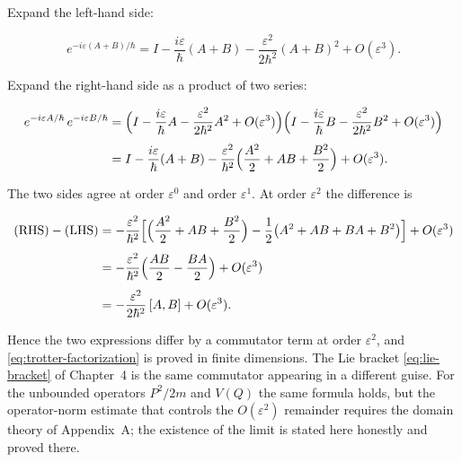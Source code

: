 \medskip\noindent Expand the left-hand side:
\begin{linenomath}
\begin{equation*}
e^{-i\varepsilon(A+B)/\hbar}
= I - \frac{i\varepsilon}{\hbar}(A+B) - \frac{\varepsilon^2}{2\hbar^2}(A+B)^2 + O(\varepsilon^3) .
\end{equation*}
\end{linenomath}
Expand the right-hand side as a product of two series:
\begin{linenomath}
\begin{equation*}
\begin{aligned}
e^{-i\varepsilon A/\hbar}\,e^{-i\varepsilon B/\hbar}
&= \Bigl(I - \frac{i\varepsilon}{\hbar}A - \frac{\varepsilon^2}{2\hbar^2}A^2 + O(\varepsilon^3)\Bigr)
   \Bigl(I - \frac{i\varepsilon}{\hbar}B - \frac{\varepsilon^2}{2\hbar^2}B^2 + O(\varepsilon^3)\Bigr) \\[4pt]
&= I - \frac{i\varepsilon}{\hbar}(A+B)
   - \frac{\varepsilon^2}{\hbar^2}\Bigl(\frac{A^2}{2} + AB + \frac{B^2}{2}\Bigr) + O(\varepsilon^3) .
\end{aligned}
\end{equation*}
\end{linenomath}
The two sides agree at order $\varepsilon^0$ and order $\varepsilon^1$. At order $\varepsilon^2$ the difference is
\begin{linenomath}
\begin{equation*}
\begin{aligned}
\text{(RHS)} - \text{(LHS)}
&= -\frac{\varepsilon^2}{\hbar^2}\Bigl[\Bigl(\frac{A^2}{2} + AB + \frac{B^2}{2}\Bigr)
   - \frac{1}{2}\bigl(A^2 + AB + BA + B^2\bigr)\Bigr] + O(\varepsilon^3) \\[4pt]
&= -\frac{\varepsilon^2}{\hbar^2}\Bigl(\frac{AB}{2} - \frac{BA}{2}\Bigr) + O(\varepsilon^3) \\[4pt]
&= -\frac{\varepsilon^2}{2\hbar^2}\,[A,B] + O(\varepsilon^3) .
\end{aligned}
\end{equation*}
\end{linenomath}
Hence the two expressions differ by a commutator term at order $\varepsilon^2$, and \eqref{eq:trotter-factorization} is proved in finite dimensions. The Lie bracket \eqref{eq:lie-bracket} of Chapter~4 is the same commutator appearing in a different guise. For the unbounded operators $P^2/2m$ and $V(Q)$ the same formula holds, but the operator-norm estimate that controls the $O(\varepsilon^2)$ remainder requires the domain theory of Appendix~A; the existence of the limit is stated here honestly and proved there.


